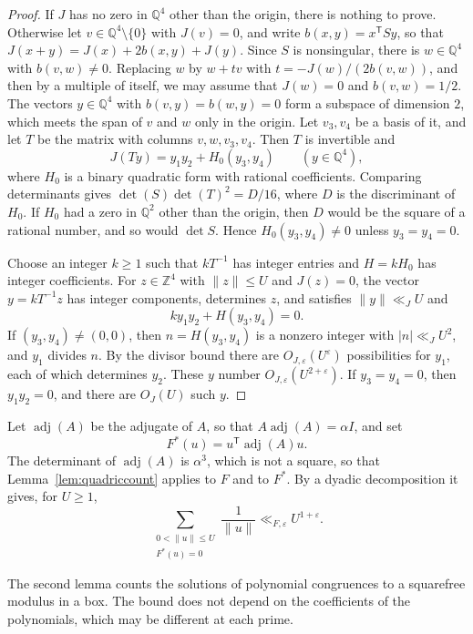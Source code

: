 \documentclass[11pt]{amsart}
\numberwithin{equation}{section}
\numberwithin{figure}{section}
\theoremstyle{definition}
\newcommand{\Z}{\mathbb{Z}}
\newcommand{\Q}{\mathbb{Q}}
\newcommand{\F}{\mathcal{F}}
\newcommand{\eps}{\varepsilon}
\newcommand{\abs}[1]{\lvert #1\rvert}
\newcommand{\adj}{\operatorname{adj}}
\begin{document}
\begin{proof}
If $J$ has no zero in $\Q^4$ other than the origin, there is nothing
to prove. Otherwise let $v\in\Q^4\setminus\{0\}$ with $J(v)=0$, and
write $b(x,y)=x^{\mathsf T}Sy$, so that
$J(x+y)=J(x)+2b(x,y)+J(y)$. Since $S$ is nonsingular, there is
$w\in\Q^4$ with $b(v,w)\ne0$. Replacing $w$ by $w+tv$ with
$t=-J(w)/(2b(v,w))$, and then by a multiple of itself, we may assume
that $J(w)=0$ and $b(v,w)=1/2$. The vectors $y\in\Q^4$ with
$b(v,y)=b(w,y)=0$ form a subspace of dimension $2$, which meets the
span of $v$ and $w$ only in the origin. Let $v_3,v_4$ be a basis of
it, and let $T$ be the matrix with columns $v,w,v_3,v_4$. Then $T$ is
invertible and
\[
 J(Ty)=y_1y_2+H_0(y_3,y_4)\qquad(y\in\Q^4),
\]
where $H_0$ is a binary quadratic form with rational coefficients.
Comparing determinants gives $\det(S)\det(T)^2=D/16$, where $D$ is the
discriminant of $H_0$. If $H_0$ had a zero in $\Q^2$ other than the
origin, then $D$ would be the square of a rational number, and so
would $\det S$. Hence $H_0(y_3,y_4)\ne0$ unless $y_3=y_4=0$.

Choose an integer $k\ge1$ such that $kT^{-1}$ has integer entries and
$H=kH_0$ has integer coefficients. For $z\in\Z^4$ with
$\lVert z\rVert\le U$ and $J(z)=0$, the vector $y=kT^{-1}z$ has
integer components, determines $z$, and satisfies
$\lVert y\rVert\ll_JU$ and
\[
 ky_1y_2+H(y_3,y_4)=0.
\]
If $(y_3,y_4)\ne(0,0)$, then $n=H(y_3,y_4)$ is a nonzero integer with
$\abs n\ll_JU^2$, and $y_1$ divides $n$. By the divisor bound there
are $O_{J,\eps}(U^\eps)$ possibilities for $y_1$, each of which
determines $y_2$. These $y$ number $O_{J,\eps}(U^{2+\eps})$. If
$y_3=y_4=0$, then $y_1y_2=0$, and there are $O_J(U)$ such $y$.
\end{proof}

Let $\adj(A)$ be the adjugate of $A$, so that $A\adj(A)=\alpha I$,
and set
\begin{equation}\label{eq:dualform}
 F^*(u)=u^{\mathsf T}\adj(A)u.
\end{equation}
The determinant of $\adj(A)$ is $\alpha^3$, which is not a square, so
that Lemma~\ref{lem:quadriccount} applies to $F$ and to $F^*$. By a
dyadic decomposition it gives, for $U\ge1$,
\begin{equation}\label{eq:conecount}
 \sum_{\substack{0<\lVert u\rVert\le U\\F^*(u)=0}}\frac1{\lVert u\rVert}
 \ll_{F,\eps}U^{1+\eps}.
\end{equation}

The second lemma counts the solutions of polynomial congruences to a
squarefree modulus in a box. The bound does not depend on the
coefficients of the polynomials, which may be different at each
prime.
\end{document}
